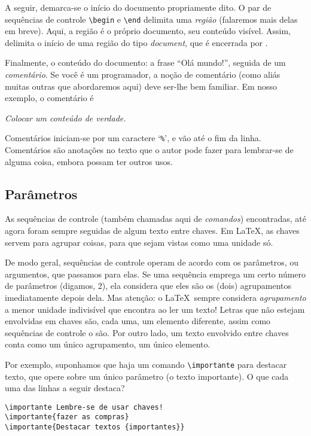 A seguir, demarca-se o início do documento propriamente dito. O par de
sequências de controle \verb!\begin! e \verb!\end! delimita uma
\emph{região} (falaremos mais delas em breve). Aqui, a região é o
próprio documento, seu conteúdo visível. Assim,
\verb!! delimita o início de uma região do tipo
\emph{document}, que é encerrada por \verb!!.

Finalmente, o conteúdo do documento: a frase ``Olá mundo!'', seguida
de um \emph{comentário}. Se você é um programador, a noção de
comentário (como aliás muitas outras que abordaremos aqui)  deve
ser-lhe bem familiar. Em nosso exemplo, o comentário é 

\begin{center}
  \it Colocar um conteúdo de verdade.
\end{center}

Comentários iniciam-se por um caractere `\verb.%.', e vão até o fim da
linha. Comentários são anotações no texto que o autor pode fazer para
lembrar-se de alguma coisa, embora possam ter outros usos.

\subsection{Parâmetros}

As sequências de controle (também chamadas aqui de
\emph{comandos}) encontradas,  até agora foram
sempre seguidas de algum texto entre chaves. Em \LaTeX, as chaves
servem para agrupar coisas, para que sejam vistas como uma unidade
só. 

De modo geral, sequências de controle operam de acordo com os
parâmetros, ou argumentos, que passamos para elas. Se uma sequência
emprega um certo número de parâmetros (digamos, 2), ela considera que
eles são os (dois) agrupamentos imediatamente depois dela. Mas
atenção: o \LaTeX\ sempre considera \emph{agrupamento} a menor unidade indivisível
que encontra ao ler um texto! Letras que não estejam  envolvidas em
chaves são, cada uma, um elemento diferente, assim como sequências de
controle o são. Por outro lado, um texto envolvido entre chaves conta
como um único agrupamento, um único elemento.

Por exemplo, suponhamos que haja um comando \verb!\importante! para
destacar texto, que opere sobre um único parâmetro (o texto
importante). O que cada uma das linhas a seguir destaca?

\begin{footnotesize}
\begin{verbatim}
\importante Lembre-se de usar chaves!
\importante{fazer as compras}
\importante{Destacar textos {importantes}}
\end{verbatim}
\end{footnotesize}

